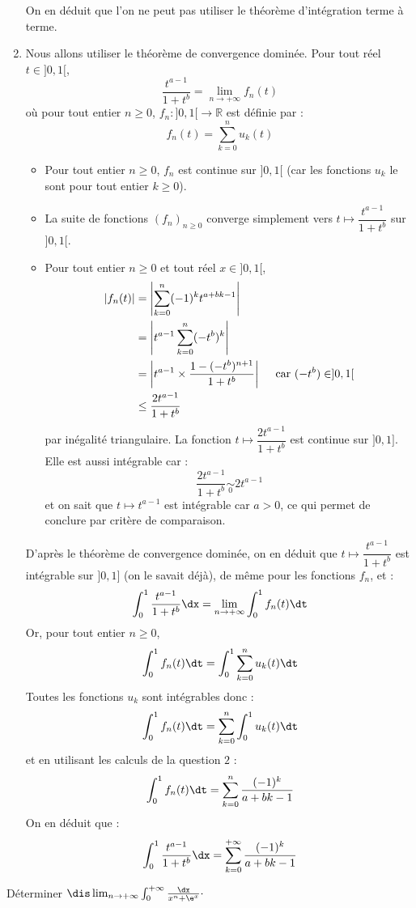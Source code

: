 \documentclass[a4paper,10pt]{report}
\begin{document}
\begin{enumerate}
\noindent On en déduit que l'on ne peut pas utiliser le théorème d'intégration terme à terme.
\item Nous allons utiliser le théorème de convergence dominée. Pour tout réel $t \in ]0,1[$,
$$ \dfrac{t^{a-1}}{1+t^b} = \lim_{n \rightarrow + \infty} f_n(t)$$
où pour tout entier $n \geq 0$, $f_n : ]0,1[ \rightarrow \mathbb{R}$ est définie par :
$$ f_n(t) = \sum_{k=0}^n u_k(t) $$
\begin{itemize}
\item Pour tout entier $n \geq 0$, $f_n$ est continue sur $]0,1[$ (car les fonctions $u_k$ le sont pour tout entier $k \geq 0$).
\item La suite de fonctions $(f_n)_{n \geq 0}$ converge simplement vers $t \mapsto \dfrac{t^{a-1}}{1+t^b}$ sur $]0,1[$.
\item Pour tout entier $n \geq 0$ et tout réel $x \in ]0,1[$,
\begin{align*}
\vert f_n(t) \vert & = \left\vert \sum_{k=0}^n (-1)^k t^{a+bk-1} \right\vert \\
& =   \left\vert t^{a-1} \sum_{k=0}^n (-t^b)^k  \right\vert \\
& = \left\vert t^{a-1} \times \dfrac{1-(-t^b)^{n+1}}{1+t^b} \right\vert \quad \hbox{ car } (-t^b) \in ]0,1[ \\
& \leq \dfrac{2 t^{a-1}}{1+t^b}
\end{align*}
par inégalité triangulaire. La fonction $t \mapsto \dfrac{2 t^{a-1}}{1+t^b}$ est continue sur $]0,1]$. Elle est aussi intégrable car :
$$ \dfrac{2 t^{a-1}}{1+t^b} \underset{0}{\sim} 2 t^{a-1}$$
et on sait que $t \mapsto t^{a-1}$ est intégrable car $a>0$, ce qui permet de conclure par critère de comparaison.
\end{itemize}
D'après le théorème de convergence dominée, on en déduit que $t \mapsto \dfrac{t^{a-1}}{1+t^b}$ est intégrable sur $]0,1]$ (on le savait déjà), de même pour les fonctions $f_n$, et :
$$ \int_0^1 \dfrac{t^{a-1}}{1+t^b} \dx = \lim_{n \rightarrow + \infty} \int_0^1 f_n(t) \dt$$
Or, pour tout entier $n \geq 0$,
$$ \int_0^1 f_n(t) \dt = \int_0^1 \sum_{k=0}^n u_k(t) \dt $$
Toutes les fonctions $u_k$ sont intégrables donc :
$$  \int_0^1 f_n(t) \dt = \sum_{k=0}^n \int_0^1  u_k(t) \dt $$
et en utilisant les calculs de la question $2$ :
$$  \int_0^1 f_n(t) \dt = \sum_{k=0}^n \dfrac{(-1)^k}{a+bk-1}$$
On en déduit que :
$$\int_0^1 \dfrac{t^{a-1}}{1+t^b} \dx =\sum_{k=0}^{+ \infty} \dfrac{(-1)^k}{a+bk-1}$$
 \end{enumerate}
 
 \begin{Exercice}{} Déterminer $\dis \lim_{n \rightarrow + \infty} \int_{0}^{ + \infty} \frac{\dx}{x^{n} + \e^{x}} \cdot$
 \end{Exercice}
 
\end{document}
